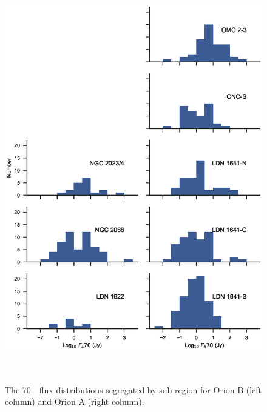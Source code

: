 \documentclass[manuscript]{aastex61}
\begin{document}
\begin{figure}[ht]
\centering
\includegraphics[height=7in]{figures/LF70_byregion.eps}
\caption{The 70~\micron\ flux distributions segregated by sub-region for Orion B (left column) and Orion A (right column).\label{fig:fd70regional}}
\end{figure}

\clearpage
\end{document}
